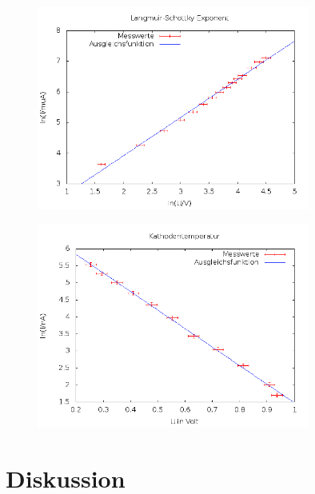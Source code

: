 \begin{figure}[H]
\includegraphics[width=0.8\textwidth]{pics/504b2.png}
\end{figure}

\begin{figure}[H]
\includegraphics[width=0.8\textwidth]{pics/504c.png}
\end{figure}



\section{Diskussion}





